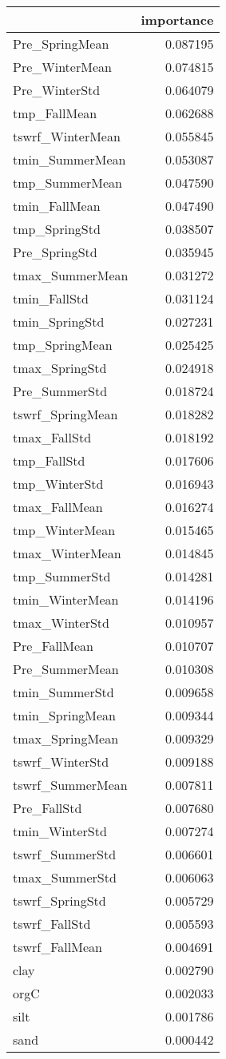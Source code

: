 \begin{tabular}{lr}
\toprule
 & importance \\
\midrule
Pre_SpringMean & 0.087195 \\
Pre_WinterMean & 0.074815 \\
Pre_WinterStd & 0.064079 \\
tmp_FallMean & 0.062688 \\
tswrf_WinterMean & 0.055845 \\
tmin_SummerMean & 0.053087 \\
tmp_SummerMean & 0.047590 \\
tmin_FallMean & 0.047490 \\
tmp_SpringStd & 0.038507 \\
Pre_SpringStd & 0.035945 \\
tmax_SummerMean & 0.031272 \\
tmin_FallStd & 0.031124 \\
tmin_SpringStd & 0.027231 \\
tmp_SpringMean & 0.025425 \\
tmax_SpringStd & 0.024918 \\
Pre_SummerStd & 0.018724 \\
tswrf_SpringMean & 0.018282 \\
tmax_FallStd & 0.018192 \\
tmp_FallStd & 0.017606 \\
tmp_WinterStd & 0.016943 \\
tmax_FallMean & 0.016274 \\
tmp_WinterMean & 0.015465 \\
tmax_WinterMean & 0.014845 \\
tmp_SummerStd & 0.014281 \\
tmin_WinterMean & 0.014196 \\
tmax_WinterStd & 0.010957 \\
Pre_FallMean & 0.010707 \\
Pre_SummerMean & 0.010308 \\
tmin_SummerStd & 0.009658 \\
tmin_SpringMean & 0.009344 \\
tmax_SpringMean & 0.009329 \\
tswrf_WinterStd & 0.009188 \\
tswrf_SummerMean & 0.007811 \\
Pre_FallStd & 0.007680 \\
tmin_WinterStd & 0.007274 \\
tswrf_SummerStd & 0.006601 \\
tmax_SummerStd & 0.006063 \\
tswrf_SpringStd & 0.005729 \\
tswrf_FallStd & 0.005593 \\
tswrf_FallMean & 0.004691 \\
clay & 0.002790 \\
orgC & 0.002033 \\
silt & 0.001786 \\
sand & 0.000442 \\
\bottomrule
\end{tabular}
